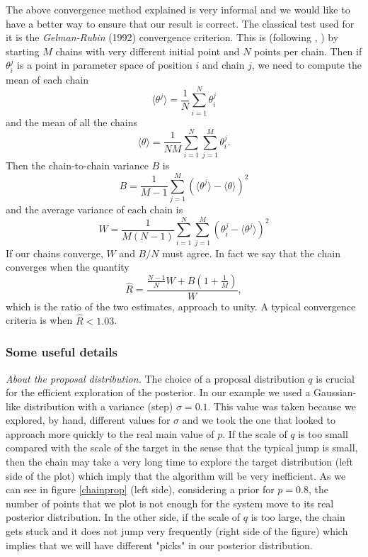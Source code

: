\documentclass[onecolumn,           %
               showpacs,            %
               preprintnumbers,     %
               aps,                 %
               prl,          	    %
               letterpaper,             %
               superscriptaddress,      %
               nofootinbib,         %
               tightenlines,        %
               floats,floatfix      %
               ,usenatbib,
               ]{revtex4-1}
\begin{document}
The above convergence method explained is very informal and we would like to have a better way to ensure that our result is correct. The classical test used for it is the \textit{Gelman-Rubin} (1992) convergence criterion. This is (following \cite{LicV2}, \cite{AlanH}) by starting $M$ chains with very different initial point and $N$ points per chain. Then if $\theta_i^j$ is a point in parameter space of position $i$ and chain $j$, we need to compute the mean of each chain 
\begin{equation}
\langle\theta^j\rangle =\frac{1}{N}\sum_{i=1}^N \theta_i^j
\end{equation}
and the mean of all the chains
\begin{equation}
\langle\theta\rangle =\frac{1}{NM}\sum_{i=1}^N\sum_{j=1}^M\theta_i^j.
\end{equation}
Then the chain-to-chain variance $B$ is
\begin{equation}
B=\frac{1}{M-1}\sum_{j=1}^M(\langle\theta^j\rangle-\langle\theta\rangle)^2
\end{equation}
and the average variance of each chain is
\begin{equation}
W=\frac{1}{M(N-1)}\sum_{i=1}^N\sum_{j=1}^M(\theta_i^j-\langle\theta^j\rangle)^2
\end{equation}
If our chains converge, $W$ and $B/N$ must agree. In fact we say that the chain converges when the quantity
\begin{equation}
\hat R=\frac{\frac{N-1}{N}W+B(1+\frac{1}{M})}{W},
\end{equation}
which is the ratio of the two estimates, approach to unity. A typical convergence criteria is when $\hat R<1.03$. 

\subsubsection{Some useful details}

\textit{About the proposal distribution.} The choice of a proposal distribution $q$ is crucial for the efficient exploration of the posterior. In our example we used a Gaussian-like distribution with a variance (step) $\sigma=0.1$. This value was taken because we explored, by hand, different values for $\sigma$ and we took the one that looked to approach more quickly to the real main value of $p$. If the scale of $q$ is too small compared with the scale of the target in the sense that the typical jump is small, then the chain may take a very long time to explore the target distribution (left side of the plot) which imply that the algorithm will be very inefficient. As we can see in figure \ref{chainprop} (left side), considering a prior for $p=0.8$, the number of points that we plot is not enough for the system move to its real posterior distribution. In the other side, if the scale of $q$ is too large, the chain gets stuck and it does not jump very frequently (right side of the figure) which implies that we will have different "picks" in our posterior distribution.    
\end{document}
